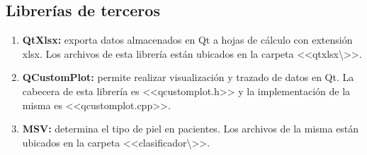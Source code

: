 \subsection*{Librer\'{i}as de terceros}

	\begin{enumerate}
		
		\item \textbf{QtXlsx:} exporta datos almacenados en Qt a hojas de c\'{a}lculo con extensi\'{o}n xlsx. Los archivos de esta librer\'{i}a est\'{a}n ubicados en la carpeta <<qtxlsx\textbackslash>>.
		
		\item \textbf{QCustomPlot:} permite realizar visualizaci\'{o}n y trazado de datos en Qt. La cabecera de esta librer\'{i}a es <<qcustomplot.h>> y la implementaci\'{o}n de la misma es <<qcustomplot.cpp>>.
		
		\item \textbf{MSV:} determina el tipo de piel en pacientes. Los archivos de la misma est\'{a}n ubicados en la carpeta <<clasificador\textbackslash>>.
	\end{enumerate}
\newpage
\renewcommand{\anchotabla}{16.5cm}
\renewcommand{\altocelda}{2pt}

